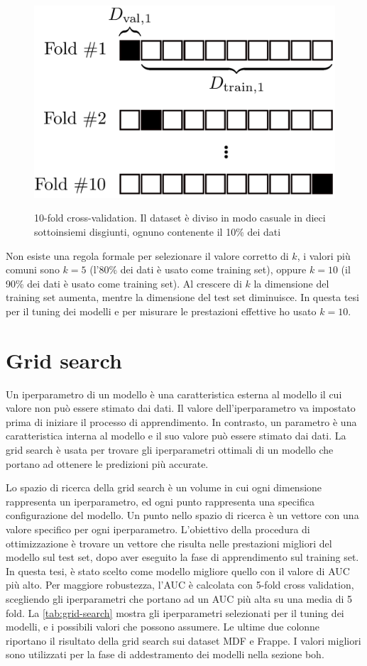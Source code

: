 \documentclass[12pt,italian]{report}
\begin{document}
\begin{figure}
  \centering
  \includegraphics[scale=0.40]{immagini/kfold.png}
  \caption{10-fold cross-validation. Il dataset è diviso in modo casuale in dieci sottoinsiemi disgiunti, ognuno contenente il 10\% dei dati}
  \cite{k-fold}
  \label{fig:kfold}
\end{figure}

Non esiste una regola formale per selezionare il valore corretto di $k$, i valori più comuni sono $k=5$ (l'80\% dei dati è usato come training set), oppure $k=10$ (il 90\% dei dati è usato come training set). Al crescere di $k$ la dimensione del training set aumenta, mentre la dimensione del test set diminuisce. In questa tesi per il tuning dei modelli e per misurare le prestazioni effettive ho usato $k=10$.

\section{Grid search}
Un iperparametro di un modello è una caratteristica esterna al modello il cui valore non può essere stimato dai dati. Il valore dell'iperparametro va impostato prima di iniziare il processo di apprendimento. In contrasto, un parametro è una caratteristica interna al modello e il suo valore può essere stimato dai dati. La grid search è usata per trovare gli iperparametri ottimali di un modello che portano ad ottenere le predizioni più accurate. 

Lo spazio di ricerca della grid search è un volume in cui ogni dimensione rappresenta un iperparametro, ed ogni punto rappresenta una specifica configurazione del modello. Un punto nello spazio di ricerca è un vettore con una valore specifico per ogni iperparametro. L'obiettivo della procedura di ottimizzazione è trovare un vettore che risulta nelle prestazioni migliori del modello sul test set, dopo aver eseguito la fase di apprendimento sul training set. In questa tesi, è stato scelto come modello migliore quello con il valore di AUC più alto. Per maggiore robustezza, l'AUC è calcolata con 5-fold cross validation, scegliendo gli iperparametri che portano ad un AUC più alta su una media di 5 fold. La \autoref{tab:grid-search} mostra gli iperparametri selezionati per il tuning dei modelli, e i possibili valori che possono assumere. Le ultime due colonne riportano il risultato della grid search sui dataset MDF e Frappe. I valori migliori sono utilizzati per la fase di addestramento dei modelli nella sezione boh.
\end{document}
